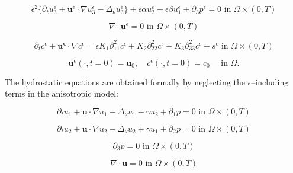 \documentclass[12pt]{report}
\numberwithin{theorem}{chapter}
\numberwithin{corollary}{chapter}
\numberwithin{lemma}{chapter}
\numberwithin{remark}{chapter}
\numberwithin{definition}{chapter}
\numberwithin{prop}{chapter}
\begin{document}
\begin{equation} \label{ANSC3_coordinates_DWMC}
  \epsilon^2 \{  \partial_t u_3^\epsilon + \mathbf{u}^\epsilon \cdot \nabla u_3^\epsilon -\Delta_\nu u_3^{\epsilon} \} + \epsilon \alpha u^\epsilon_2 - \epsilon \beta u_1^\epsilon + \partial_3 p^\epsilon = 0 \text{ in } \Omega \times (0,T)
\end{equation}

\begin{equation} \label{ANSC4_coordinates_DWMC}
  \nabla \cdot \mathbf{u}^\epsilon= 0 \text{ in } \Omega \times (0,T)
\end{equation}

\begin{equation} \label{ANSC5_coordinates_DWMC}
   \partial_t c^\epsilon + \mathbf{u^\epsilon} \cdot \nabla c^\epsilon = \epsilon K_1 \partial_{11} ^ 2 c^\epsilon + K_2 \partial_{22} ^ 2 c^\epsilon + K_3 \partial_{33} ^ 2 c^\epsilon + s^\epsilon \text{ in } \Omega \times (0,T)
\end{equation}

\begin{equation} \label{ANSC_init_coordinates_DWMC}
  \mathbf{u}^\epsilon (\cdot, t = 0) = \mathbf{u}_0, \quad c^\epsilon (\cdot, t=0) = c_0  \quad \text{ in } \Omega.
\end{equation}

The hydrostatic equations are obtained formally by neglecting the $\epsilon$--including terms in the anisotropic model:

\begin{equation} \label{HNSC1_coordinates_DWMC}    
  \partial_t u_1 + \mathbf{u} \cdot \nabla u_1 - \Delta_\nu u_1 -\gamma u_2 + \partial_1 p = 0 \text{ in } \Omega \times (0,T)
\end{equation}

\begin{equation} \label{HNSC2_coordinates_DWMC}   
  \partial_t u_2 + \mathbf{u} \cdot \nabla u_2 - \Delta_\nu u_2 + \gamma u_1 + \partial_2 p = 0 \text{ in } \Omega \times (0,T)
\end{equation}

\begin{equation} \label{HNSC3_coordinates_DWMC}   
  \partial_3 p = 0 \text{ in } \Omega \times (0,T)
\end{equation}

\begin{equation} \label{HNSC4_coordinates_DWMC}   
  \nabla \cdot \mathbf{u} = 0 \text{ in } \Omega \times (0,T)
\end{equation}
\end{document}
